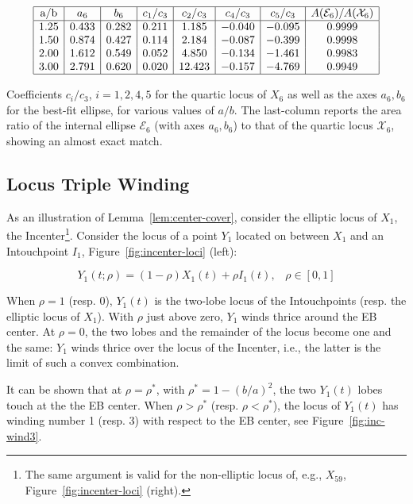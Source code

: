 \begin{table}[H]
    \centering
$$
\begin{array}{|c|c|c|c|c|c|c|c|}
\hline
 \text{a/b} & a_6 & b_6 & c_1/c_3 & c_2/c_3 & c_4/c_3 & c_5/c_3 & A(\mathcal{E}_6)/A(\mathcal{X}_6) \\
 \hline
  1.25 & 0.433 & 0.282 & 0.211 & 1.185 & -0.040 & -0.095 & 0.9999 \\
 1.50 & 0.874 & 0.427 & 0.114 & 2.184 & -0.087 & -0.399 & 0.9998 \\
 2.00 & 1.612 & 0.549 & 0.052 & 4.850 & -0.134 & -1.461 & 0.9983 \\
 3.00 & 2.791 & 0.620 & 0.020 & 12.423 & -0.157 & -4.769 & 0.9949 \\
 \hline
\end{array}
$$
\caption{Coefficients $c_i/c_3$, $i=1,2,4,5$ for the quartic locus of $X_6$ as well as the axes $a_6,b_6$ for the best-fit ellipse, for various values of $a/b$. The last-column reports the area ratio of the internal ellipse $\mathcal{E}_6$ (with axes $a_6,b_6$) to that of the quartic locus $\mathcal{X}_6$, showing an almost exact match.}
\label{tab:quartic-coeffs}
\end{table}

\subsection{Locus Triple Winding}
\label{sec:triple-winding}

As an illustration of Lemma~\ref{lem:center-cover}, consider the elliptic locus of $X_1$, the Incenter\footnote{The same argument is valid for the non-elliptic locus of, e.g., $X_{59}$, Figure~\ref{fig:incenter-loci} (right).}. Consider the locus of a point $Y_1$ located on between $X_1$ and an Intouchpoint $I_1$, Figure~\ref{fig:incenter-loci} (left):
 
\begin{equation*}
Y_1(t;\rho)=(1-{\rho})X_1(t)+{\rho}I_1(t),\;\;\;\rho\in[0,1]
 \end{equation*}
 
\noindent When $\rho=1$ (resp. $0$), $Y_1(t)$ is the two-lobe locus of the Intouchpoints (resp. the elliptic locus of $X_1$). With $\rho$ just above zero, $Y_1$ winds thrice around the EB center. At $\rho=0$, the two lobes and the remainder of the locus become one and the same: $Y_1$ winds thrice over the locus of the Incenter, i.e., the latter is the limit of such a convex combination.

It can be shown that at $\rho=\rho^*$, with $\rho^*=1-(b/a)^2$, the two $Y_1(t)$ lobes touch at the the EB center. When $\rho>\rho^*$ (resp. $\rho<\rho^*$), the locus of $Y_1(t)$ has winding number 1 (resp. 3) with respect to the EB center, see Figure~\ref{fig:inc-wind3}.

